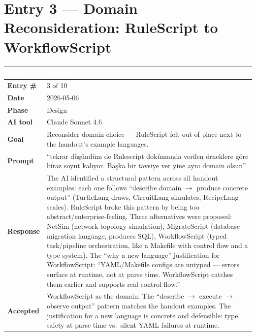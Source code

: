 \documentclass[a4paper,10pt]{article}
\begin{document}
\section{Entry 3 --- Domain Reconsideration: RuleScript to WorkflowScript}

\begin{tabular}{|
    >{\bfseries}m{3.5cm}|
    m{10cm}|
}
\hline
\rowcolor{headerblue}
\textcolor{white}{Field} & \textcolor{white}{\textbf{Content}} \\
\hline
\rowcolor{white}
Entry \#        & 3 of 10 \\
\hline
\rowcolor{altrow}
Date            & 2026-05-06 \\
\hline
\rowcolor{white}
Phase           & Design \\
\hline
\rowcolor{altrow}
AI tool         & Claude Sonnet 4.6  \\
\hline
\rowcolor{white}
Goal            & Reconsider domain choice --- RuleScript felt out of place next to the handout's example languages. \\
\hline
\rowcolor{altrow}
Prompt          & ``tekrar düşündüm de Rulescript dokümanda verilen örneklere göre biraz soyut kalıyor. Başka bir tavsiye ver yine aynı domain olsun'' \\
\hline
\rowcolor{white}
Response & The AI identified a structural pattern across all handout examples: each one follows ``describe domain $\rightarrow$ produce concrete output'' (TurtleLang draws, CircuitLang simulates, RecipeLang scales). RuleScript broke this pattern by being too abstract/enterprise-feeling. Three alternatives were proposed: NetSim (network topology simulation), MigrateScript (database migration language, produces SQL), WorkflowScript (typed task/pipeline orchestration, like a Makefile with control flow and a type system). The ``why a new language'' justification for WorkflowScript: ``YAML/Makefile configs are untyped --- errors surface at runtime, not at parse time. WorkflowScript catches them earlier and supports real control flow.'' \\
\hline
\rowcolor{altrow}
Accepted        & WorkflowScript as the domain. The ``describe $\rightarrow$ execute $\rightarrow$ observe output'' pattern matches the handout examples. The justification for a new language is concrete and defensible: type safety at parse time vs.\ silent YAML failures at runtime. \\

\end{tabular}
\end{document}
